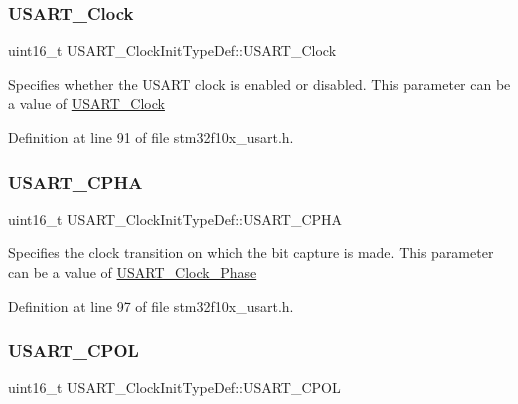 \subsubsection{\texorpdfstring{U\+S\+A\+R\+T\+\_\+\+Clock}{USART\_Clock}}
{\footnotesize\ttfamily uint16\+\_\+t U\+S\+A\+R\+T\+\_\+\+Clock\+Init\+Type\+Def\+::\+U\+S\+A\+R\+T\+\_\+\+Clock}

Specifies whether the U\+S\+A\+RT clock is enabled or disabled. This parameter can be a value of \hyperlink{group___u_s_a_r_t___clock}{U\+S\+A\+R\+T\+\_\+\+Clock} 

Definition at line 91 of file stm32f10x\+\_\+usart.\+h.

\mbox{\label{struct_u_s_a_r_t___clock_init_type_def_abda3a2172bd5819e1c207dc0d1c822d8}} 
\subsubsection{\texorpdfstring{U\+S\+A\+R\+T\+\_\+\+C\+P\+HA}{USART\_CPHA}}
{\footnotesize\ttfamily uint16\+\_\+t U\+S\+A\+R\+T\+\_\+\+Clock\+Init\+Type\+Def\+::\+U\+S\+A\+R\+T\+\_\+\+C\+P\+HA}

Specifies the clock transition on which the bit capture is made. This parameter can be a value of \hyperlink{group___u_s_a_r_t___clock___phase}{U\+S\+A\+R\+T\+\_\+\+Clock\+\_\+\+Phase} 

Definition at line 97 of file stm32f10x\+\_\+usart.\+h.

\mbox{\label{struct_u_s_a_r_t___clock_init_type_def_a01450cba8a40cf9a624b25979dc6aa77}} 
\subsubsection{\texorpdfstring{U\+S\+A\+R\+T\+\_\+\+C\+P\+OL}{USART\_CPOL}}
{\footnotesize\ttfamily uint16\+\_\+t U\+S\+A\+R\+T\+\_\+\+Clock\+Init\+Type\+Def\+::\+U\+S\+A\+R\+T\+\_\+\+C\+P\+OL}

